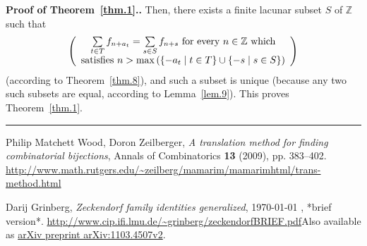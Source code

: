 \documentclass[numbers=enddot,12pt,final,onecolumn,notitlepage]{scrartcl}%
\numberwithin{exer}{section}
\theoremstyle{definition}
\newenvironment{proof}[1][Proof]{\noindent\textbf{#1.} }{\ \rule{0.5em}{0.5em}}
\let\sumnonlimits\sum
\renewcommand{\sum}{\sumnonlimits\limits}
\begin{document}
\begin{proof}[Proof of Theorem~\ref{thm.1}.] Then, there exists a finite lacunar subset $S$ of
$\mathbb{Z}$ such that
\[
\left(
\begin{array}
[c]{c}%
\sum\limits_{t\in T}f_{n+a_{t}}=\sum\limits_{s\in S}f_{n+s}\text{ for every
}n\in\mathbb{Z}\text{ which}\\
\text{satisfies }n>\max\left(  \left\{  -a_{t}\mid t\in T\right\}
\cup\left\{  -s\mid s\in S\right\}  \right)
\end{array}
\right)
\]
(according to Theorem~\ref{thm.8}), and such a subset is unique (because any two such
subsets are equal, according to Lemma~\ref{lem.9}). This proves Theorem~\ref{thm.1}.
\end{proof}

\begin{thebibliography}{9}                                                                                                %


Philip Matchett Wood, Doron Zeilberger, \textit{A translation
method for finding combinatorial bijections}, Annals of Combinatorics
\textbf{13} (2009), pp. 383--402. \newline\url{http://www.math.rutgers.edu/~zeilberg/mamarim/mamarimhtml/trans-method.html}

Darij Grinberg, \textit{Zeckendorf family identities
generalized},
\today
, *brief version*.\newline%
\url{http://www.cip.ifi.lmu.de/~grinberg/zeckendorfBRIEF.pdf}\newline Also
available as \href{https://arxiv.org/abs/1103.4507v2}{arXiv preprint
arXiv:1103.4507v2}.
\end{thebibliography}
\end{document}
